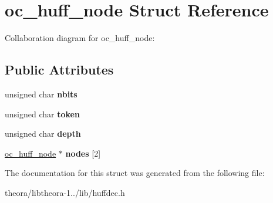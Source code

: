 \hypertarget{structoc__huff__node}{\section{oc\+\_\+huff\+\_\+node Struct Reference}
\label{structoc__huff__node}
}


Collaboration diagram for oc\+\_\+huff\+\_\+node\+:
\subsection*{Public Attributes}
\begin{DoxyCompactItemize}
\item 
\hypertarget{structoc__huff__node_ac1071615f9f60a55eea72d1d8f12fc7a}{unsigned char {\bfseries nbits}}\label{structoc__huff__node_ac1071615f9f60a55eea72d1d8f12fc7a}

\item 
\hypertarget{structoc__huff__node_a1a3b7463bb344fefcee2fa77fe30c427}{unsigned char {\bfseries token}}\label{structoc__huff__node_a1a3b7463bb344fefcee2fa77fe30c427}

\item 
\hypertarget{structoc__huff__node_a42116b271ad12c7c0ffbec80c6ae6173}{unsigned char {\bfseries depth}}\label{structoc__huff__node_a42116b271ad12c7c0ffbec80c6ae6173}

\item 
\hypertarget{structoc__huff__node_a4b87817890578be3d28981ec6e53947c}{\hyperlink{structoc__huff__node}{oc\+\_\+huff\+\_\+node} $\ast$ {\bfseries nodes} \mbox{[}2\mbox{]}}\label{structoc__huff__node_a4b87817890578be3d28981ec6e53947c}

\end{DoxyCompactItemize}


The documentation for this struct was generated from the following file\+:\begin{DoxyCompactItemize}
\item 
theora/libtheora-\/1../lib/huffdec.\+h\end{DoxyCompactItemize}
